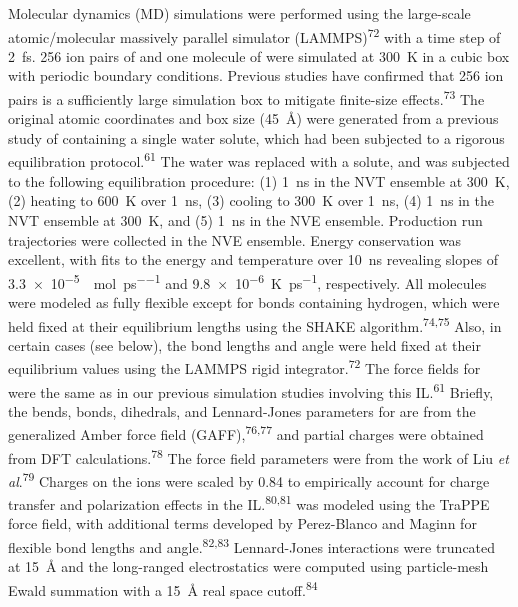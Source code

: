 \documentclass[]{article}
\begin{document}
Molecular dynamics (MD) simulations were performed using the large-scale atomic/molecular massively parallel simulator (LAMMPS)\textsuperscript{72} with a time step of \SI{2}{\femto\second}. \num{256} ion pairs of \ce{[C4C1im][PF6]} and one molecule of  were simulated at \SI{300}{\kelvin} in a cubic box with periodic boundary conditions. Previous studies have confirmed that \num{256} ion pairs is a sufficiently large simulation box to mitigate finite-size effects.\textsuperscript{73} The original atomic coordinates and box size (\SI{45}{\angstrom}) were generated from a previous study of \ce{[C4C1im][PF6]} containing a single water solute, which had been subjected to a rigorous equilibration protocol.\textsuperscript{61} The water was replaced with a  solute, and was subjected to the following equilibration procedure: (1) \SI{1}{\nano\second} in the NVT ensemble at \SI{300}{\kelvin}, (2) heating to \SI{600}{\kelvin} over \SI{1}{\nano\second}, (3) cooling to \SI{300}{\kelvin} over \SI{1}{\nano\second}, (4) \SI{1}{\nano\second} in the NVT ensemble at \SI{300}{\kelvin}, and (5) \SI{1}{\nano\second} in the NVE ensemble. Production run trajectories were collected in the NVE ensemble. Energy conservation was excellent, with fits to the energy and temperature over \SI{10}{\nano\second} revealing slopes of \SI{3.3e-5}{\kcal\per\mole\per\pico\second} and \SI{9.8e-6}{\kelvin\per\pico\second}, respectively. All molecules were modeled as fully flexible except for bonds containing hydrogen, which were held fixed at their equilibrium lengths using the SHAKE algorithm.\textsuperscript{74,75} Also, in certain cases (see below), the  bond lengths and angle were held fixed at their equilibrium values using the LAMMPS rigid integrator.\textsuperscript{72} The force fields for \ce{[C4C1im][PF6]} were the same as in our previous simulation studies involving this IL.\textsuperscript{61} Briefly, the bends, bonds, dihedrals, and Lennard-Jones parameters for \ce{[C4C1im]+} are from the generalized Amber force field (GAFF),\textsuperscript{76,77} and partial charges were obtained from DFT calculations.\textsuperscript{78} The \ce{[PF6]-} force field parameters were from the work of Liu \emph{et al}.\textsuperscript{79} Charges on the ions were scaled by \num{0.84} to empirically account for charge transfer and polarization effects in the IL.\textsuperscript{80,81}  was modeled using the TraPPE force field, with additional terms developed by Perez-Blanco and Maginn for flexible bond lengths and angle.\textsuperscript{82,83} Lennard-Jones interactions were truncated at \SI{15}{\angstrom} and the long-ranged electrostatics were computed using particle-mesh Ewald summation with a \SI{15}{\angstrom} real space cutoff.\textsuperscript{84}
\end{document}
